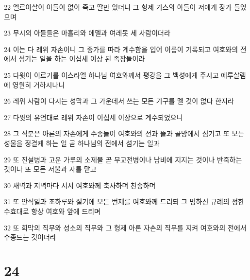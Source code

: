 \par 22 엘르아살이 아들이 없이 죽고 딸만 있더니 그 형제 기스의 아들이 저에게 장가 들었으며
\par 23 무시의 아들들은 마흘리와 에델과 여레못 세 사람이더라
\par 24 이는 다 레위 자손이니 그 종가를 따라 계수함을 입어 이름이 기록되고 여호와의 전에서 섬기는 일을 하는 이십세 이상 된 족장들이라
\par 25 다윗이 이르기를 이스라엘 하나님 여호와께서 평강을 그 백성에게 주시고 예루살렘에 영원히 거하시나니
\par 26 레위 사람이 다시는 성막과 그 가운데서 쓰는 모든 기구를 멜 것이 없다 한지라
\par 27 다윗의 유언대로 레위 자손이 이십세 이상으로 계수되었으니
\par 28 그 직분은 아론의 자손에게 수종들어 여호와의 전과 뜰과 골방에서 섬기고 또 모든 성물을 정결케 하는 일 곧 하나님의 전에서 섬기는 일과
\par 29 또 진설병과 고운 가루의 소제물 곧 무교전병이나 남비에 지지는 것이나 반죽하는 것이나 또 모든 저울과 자를 맡고
\par 30 새벽과 저녁마다 서서 여호와께 축사하며 찬송하며
\par 31 또 안식일과 초하루와 절기에 모든 번제를 여호와께 드리되 그 명하신 규례의 정한 수효대로 항상 여호와 앞에 드리며
\par 32 또 회막의 직무와 성소의 직무와 그 형제 아론 자손의 직무를 지켜 여호와의 전에서 수종드는 것이더라

\chapter{24}

